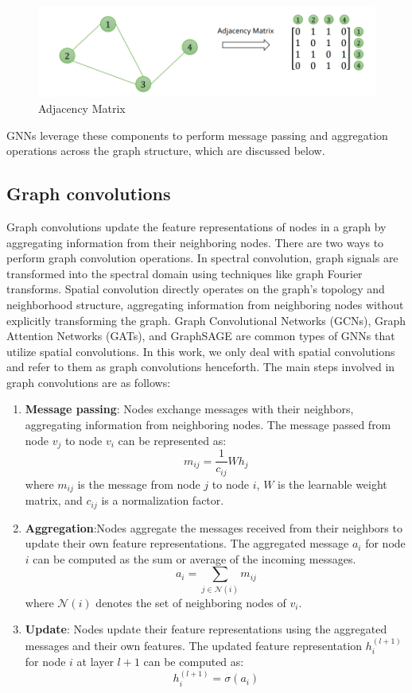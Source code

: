 \begin{figure}[ht]
  \centering
  \includegraphics[width=12cm]{images/Theory-DL/AdjMat.png}
  \caption{Adjacency Matrix}
  \label{fig:AdjMat}
\end{figure}
GNNs leverage these components to perform message passing and aggregation operations across the graph structure, which are discussed below. \\
\subsection{Graph convolutions}
Graph convolutions update the feature representations of nodes in a graph by aggregating information from their neighboring nodes. There are two ways to perform graph convolution operations. In spectral convolution, graph signals are transformed into the spectral domain using techniques like graph Fourier transforms. Spatial convolution directly operates on the graph's topology and neighborhood structure, aggregating information from neighboring nodes without explicitly transforming the graph. Graph Convolutional Networks (GCNs), Graph Attention Networks (GATs), and GraphSAGE are common types of GNNs that utilize spatial convolutions. In this work, we only deal with spatial convolutions and refer to them as graph convolutions henceforth. The main steps involved in graph convolutions are as follows:
\begin{enumerate}
    \item \textbf{Message passing}: Nodes exchange messages with their neighbors, aggregating information from neighboring nodes. The message passed from node $v_j$ to node $v_i$ can be represented as:
        \[ m_{ij} = \frac{1}{c_{ij}} W h_j \]
        where $m_{ij}$ is the message from node $j$ to node $i$, $W$ is the learnable weight matrix, and $c_{ij}$ is a normalization factor.
    
    \item \textbf{Aggregation}:Nodes aggregate the messages received from their neighbors to update their own feature representations. The aggregated message $a_i$ for node $i$ can be computed as the sum or average of the incoming messages.
        \[ a_i = \sum_{j \in \mathcal{N}(i)} m_{ij} \]
    where $\mathcal{N}(i)$ denotes the set of neighboring nodes of $v_i$.
    \item \textbf{Update}: Nodes update their feature representations using the aggregated messages and their own features. The updated feature representation $h_i^{(l+1)}$ for node $i$ at layer $l+1$ can be computed as:
        \[ h_i^{(l+1)} = \sigma(a_i) \]
\end{enumerate}
